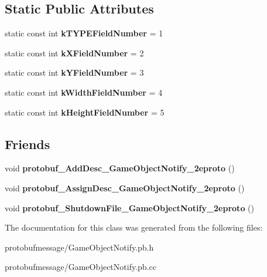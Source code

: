 \subsection*{Static Public Attributes}
\begin{DoxyCompactItemize}
\item 
\hypertarget{class_game_object_notify_a1686fae6e717999f7a4a3c883336ae5d}{static const int {\bfseries k\-T\-Y\-P\-E\-Field\-Number} = 1}\label{class_game_object_notify_a1686fae6e717999f7a4a3c883336ae5d}

\item 
\hypertarget{class_game_object_notify_a433cdc06e51abce278f247ff3a046608}{static const int {\bfseries k\-X\-Field\-Number} = 2}\label{class_game_object_notify_a433cdc06e51abce278f247ff3a046608}

\item 
\hypertarget{class_game_object_notify_a4750c0b42b3b9515597e0d6665245f56}{static const int {\bfseries k\-Y\-Field\-Number} = 3}\label{class_game_object_notify_a4750c0b42b3b9515597e0d6665245f56}

\item 
\hypertarget{class_game_object_notify_a5462ed3aee65d02ae60fe9a2de05a849}{static const int {\bfseries k\-Width\-Field\-Number} = 4}\label{class_game_object_notify_a5462ed3aee65d02ae60fe9a2de05a849}

\item 
\hypertarget{class_game_object_notify_a15142be03ab21831b8f54cd346a409a2}{static const int {\bfseries k\-Height\-Field\-Number} = 5}\label{class_game_object_notify_a15142be03ab21831b8f54cd346a409a2}

\end{DoxyCompactItemize}
\subsection*{Friends}
\begin{DoxyCompactItemize}
\item 
\hypertarget{class_game_object_notify_ad39fab9cb60a70367567c18bd3667614}{void {\bfseries protobuf\-\_\-\-Add\-Desc\-\_\-\-Game\-Object\-Notify\-\_\-2eproto} ()}\label{class_game_object_notify_ad39fab9cb60a70367567c18bd3667614}

\item 
\hypertarget{class_game_object_notify_abfcb28a9131368bf7de1e6967278aeb4}{void {\bfseries protobuf\-\_\-\-Assign\-Desc\-\_\-\-Game\-Object\-Notify\-\_\-2eproto} ()}\label{class_game_object_notify_abfcb28a9131368bf7de1e6967278aeb4}

\item 
\hypertarget{class_game_object_notify_a849952bd288bb23b66755e3f6fb3f8b6}{void {\bfseries protobuf\-\_\-\-Shutdown\-File\-\_\-\-Game\-Object\-Notify\-\_\-2eproto} ()}\label{class_game_object_notify_a849952bd288bb23b66755e3f6fb3f8b6}

\end{DoxyCompactItemize}


The documentation for this class was generated from the following files\-:\begin{DoxyCompactItemize}
\item 
protobufmessage/Game\-Object\-Notify.\-pb.\-h\item 
protobufmessage/Game\-Object\-Notify.\-pb.\-cc\end{DoxyCompactItemize}
